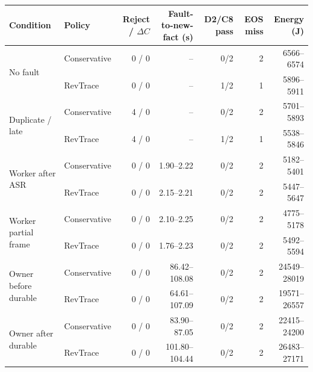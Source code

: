 \begin{tabular}{@{}llrrrrr@{}}
\toprule
Condition & Policy & Reject / $\Delta C$ & Fault-to-new-fact (s) & D2/C8 pass & EOS miss & Energy (J) \\
\midrule
\multirow{2}{*}{No fault} & Conservative & 0 / 0 & -- & 0/2 & 2 & 6566--6574 \\
 & RevTrace & 0 / 0 & -- & 1/2 & 1 & 5896--5911 \\
\multirow{2}{*}{Duplicate / late} & Conservative & 4 / 0 & -- & 0/2 & 2 & 5701--5893 \\
 & RevTrace & 4 / 0 & -- & 1/2 & 1 & 5538--5846 \\
\multirow{2}{*}{Worker after ASR} & Conservative & 0 / 0 & 1.90--2.22 & 0/2 & 2 & 5182--5401 \\
 & RevTrace & 0 / 0 & 2.15--2.21 & 0/2 & 2 & 5447--5647 \\
\multirow{2}{*}{Worker partial frame} & Conservative & 0 / 0 & 2.10--2.25 & 0/2 & 2 & 4775--5178 \\
 & RevTrace & 0 / 0 & 1.76--2.23 & 0/2 & 2 & 5492--5594 \\
\multirow{2}{*}{Owner before durable} & Conservative & 0 / 0 & 86.42--108.08 & 0/2 & 2 & 24549--28019 \\
 & RevTrace & 0 / 0 & 64.61--107.09 & 0/2 & 2 & 19571--26557 \\
\multirow{2}{*}{Owner after durable} & Conservative & 0 / 0 & 83.90--87.05 & 0/2 & 2 & 22415--24200 \\
 & RevTrace & 0 / 0 & 101.80--104.44 & 0/2 & 2 & 26483--27171 \\
\bottomrule
\end{tabular}
